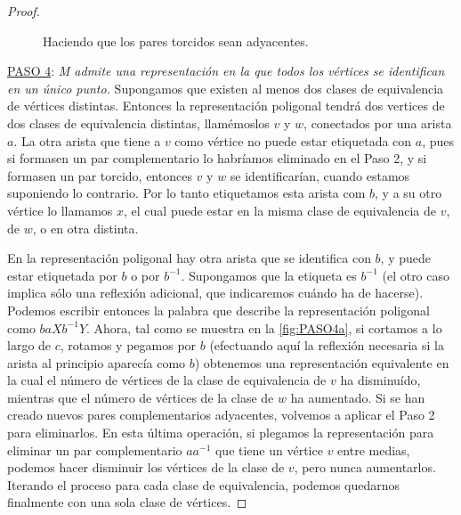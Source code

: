 \documentclass[10pt]{report}
\theoremstyle{definition}
\begin{document}
\begin{proof}
\begin{figure}
\caption{Haciendo que los pares torcidos sean adyacentes.\label{fig:PASO3}}
\end{figure}

\underline{PASO 4}: \textit{M admite una representación en la que todos los vértices se identifican en un único punto.} Supongamos que existen al menos dos clases de equivalencia de vértices distintas. Entonces la representación poligonal tendrá dos vertices de dos clases de equivalencia distintas, llamémoslos $v$ y $w$, conectados por una arista $a$. La otra arista que tiene a $v$ como vértice no puede estar etiquetada con $a$, pues si formasen un par complementario lo habríamos eliminado en el Paso 2, y si formasen un par torcido, entonces $v$ y $w$ se identificarían, cuando estamos suponiendo lo contrario. 
Por lo tanto etiquetamos esta arista com $b$, y a su otro vértice lo llamamos $x$, el cual puede estar en la misma clase de equivalencia de $v$, de $w$, o en otra distinta.

En la representación poligonal hay otra arista que se identifica con $b$, y puede estar etiquetada por $b$ o por $b^{-1}$. Supongamos que la etiqueta es $b^{-1}$ (el otro caso implica sólo una reflexión adicional, que indicaremos cuándo ha de hacerse). Podemos escribir entonces la palabra que describe la representación poligonal como $baXb^{-1}Y$. Ahora, tal como se muestra en la \autoref{fig:PASO4a}, si cortamos a lo largo de $c$, rotamos y pegamos por $b$ (efectuando aquí la reflexión necesaria si la arista al principio aparecía como $b$) obtenemos una representación equivalente en la cual el número de vértices de la clase de equivalencia de $v$ ha disminuído, mientras que el número de vértices de la clase de $w$ ha aumentado. Si se han creado nuevos pares complementarios adyacentes, volvemos a aplicar el Paso 2 para eliminarlos. En esta última operación, si plegamos la representación para eliminar un par complementario $aa^{-1}$ que tiene un vértice $v$ entre medias, podemos hacer disminuir los vértices de la clase de $v$, pero nunca aumentarlos. Iterando el proceso para cada clase de equivalencia, podemos quedarnos finalmente con una sola clase de vértices.
 


\end{proof}
\end{document}
